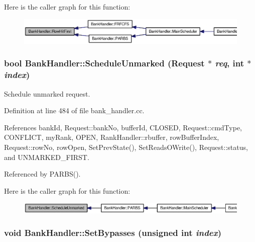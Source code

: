 Here is the caller graph for this function:\nopagebreak
\begin{figure}[H]
\begin{center}
\leavevmode
\includegraphics[width=420pt]{classBankHandler_8efd50148051d7bab539f733defbc057_icgraph}
\end{center}
\end{figure}
\subsubsection[{ScheduleUnmarked}]{\setlength{\rightskip}{0pt plus 5cm}bool BankHandler::ScheduleUnmarked ({\bf Request} $\ast$ {\em req}, \/  int $\ast$ {\em index})}\label{classBankHandler_4bc235f556be48bfd2d0f8432c43c8bd}


Schedule unmarked request. 



Definition at line 484 of file bank\_\-handler.cc.

References bankId, Request::bankNo, bufferId, CLOSED, Request::cmdType, CONFLICT, myRank, OPEN, RankHandler::rbuffer, rowBufferIndex, Request::rowNo, rowOpen, SetPrevState(), SetReadsOWrite(), Request::status, and UNMARKED\_\-FIRST.

Referenced by PARBS().

Here is the caller graph for this function:\nopagebreak
\begin{figure}[H]
\begin{center}
\leavevmode
\includegraphics[width=420pt]{classBankHandler_4bc235f556be48bfd2d0f8432c43c8bd_icgraph}
\end{center}
\end{figure}
\subsubsection[{SetBypasses}]{\setlength{\rightskip}{0pt plus 5cm}void BankHandler::SetBypasses (unsigned int {\em index})}\label{classBankHandler_d05b974c262629de52cf42219540f0e9}


